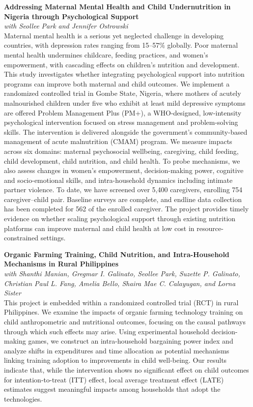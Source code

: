 \documentclass[11pt,letterpaper]{article}
\begin{document}
\textbf{Addressing Maternal Mental Health and Child Undernutrition in Nigeria through Psychological Support} \\
\textit{with Seollee Park and Jennifer Ostrowski} \\[4pt]
Maternal mental health is a serious yet neglected challenge in developing countries, with depression rates ranging from 15–57\% globally. Poor maternal mental health undermines childcare, feeding practices, and women's empowerment, with cascading effects on children's nutrition and development. This study investigates whether integrating psychological support into nutrition programs can improve both maternal and child outcomes. We implement a randomized controlled trial in Gombe State, Nigeria, where mothers of acutely malnourished children under five who exhibit at least mild depressive symptoms are offered Problem Management Plus (PM+), a WHO-designed, low-intensity psychological intervention focused on stress management and problem-solving skills. The intervention is delivered alongside the government's community-based management of acute malnutrition (CMAM) program. We measure impacts across six domains: maternal psychosocial wellbeing, caregiving, child feeding, child development, child nutrition, and child health. To probe mechanisms, we also assess changes in women's empowerment, decision-making power, cognitive and socio-emotional skills, and intra-household dynamics including intimate partner violence. To date, we have screened over 5,400 caregivers, enrolling 754 caregiver–child pair. Baseline surveys are complete, and endline data collection has been completed for 562 of the enrolled caregiver. The project provides timely evidence on whether scaling psychological support through existing nutrition platforms can improve maternal and child health at low cost in resource-constrained settings.

\textbf{Organic Farming Training, Child Nutrition, and Intra-Household Mechanisms in Rural Philippines} \\
\textit{with Shanthi Manian, Gregmar I. Galinato, Seollee Park, Suzette P. Galinato, Christian Paul L. Fang, Amelia Bello, Shaira Mae C. Calayugan, and Lorna Sister} \\[4pt]
This project is embedded within a randomized controlled trial (RCT) in rural Philippines. We examine the impacts of organic farming technology training on child anthropometric and nutritional outcomes, focusing on the causal pathways through which such effects may arise. Using experimental household decision-making games, we construct an intra-household bargaining power index and analyze shifts in expenditures and time allocation as potential mechanisms linking training adoption to improvements in child well-being. Our results indicate that, while the intervention shows no significant effect on child outcomes for intention-to-treat (ITT) effect, local average treatment effect (LATE) estimates suggest meaningful impacts among households that adopt the technologies.
\end{document}
